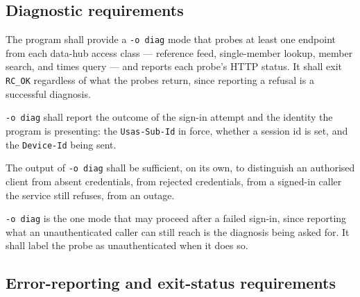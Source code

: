 \documentclass[12pt]{article}
\newcommand{\code}[1]{\texttt{#1}}
\newcommand{\req}[1]{\textbf{[#1]}}
\begin{document}
\subsection{Diagnostic requirements}

\begin{description}[style=nextline]
  \item[\req{REQ-G-01}] The program shall provide a \code{-o diag}
        mode that probes at least one endpoint from each data-hub
        access class --- reference feed, single-member lookup, member
        search, and times query --- and reports each probe's HTTP
        status.  It shall exit \code{RC\_OK} regardless of what the
        probes return, since reporting a refusal is a successful
        diagnosis.
  \item[\req{REQ-G-02}] \code{-o diag} shall report the outcome of the
        sign-in attempt and the identity the program is presenting: the
        \code{Usas-Sub-Id} in force, whether a session id is set, and
        the \code{Device-Id} being sent.
  \item[\req{REQ-G-03}] The output of \code{-o diag} shall be
        sufficient, on its own, to distinguish an authorised client
        from absent credentials, from rejected credentials, from a
        signed-in caller the service still refuses, from an outage.
  \item[\req{REQ-G-04}] \code{-o diag} is the one mode that may proceed
        after a failed sign-in, since reporting what an unauthenticated
        caller can still reach is the diagnosis being asked for.  It
        shall label the probe as unauthenticated when it does so.
\end{description}

\subsection{Error-reporting and exit-status requirements}
\end{document}
